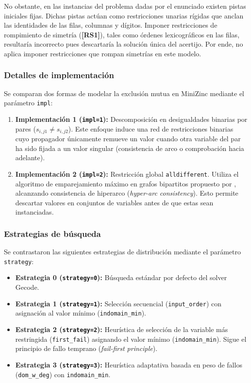 No obstante, en las instancias del problema dadas por el enunciado existen pistas iniciales fijas. Dichas pistas actúan como restricciones unarias rígidas que anclan las identidades de las filas, columnas y dígitos. Imponer restricciones de rompimiento de simetría (\textbf{[RS1]}), tales como órdenes lexicográficos en las filas, resultaría incorrecto pues descartaría la solución única del acertijo. Por ende, no aplica imponer restricciones que rompan simetrías en este modelo.

\subsubsection{Detalles de implementación}
Se comparan dos formas de modelar la exclusión mutua en MiniZinc mediante el parámetro \texttt{impl}:
\begin{enumerate}
    \item \textbf{Implementación 1 (\texttt{impl=1}):} Descomposición en desigualdades binarias por pares ($s_{i,j1} \neq s_{i,j2}$). Este enfoque induce una red de restricciones binarias cuyo propagador únicamente remueve un valor cuando otra variable del par ha sido fijada a un valor singular (consistencia de arco o comprobación hacia adelante).
    \item \textbf{Implementación 2 (\texttt{impl=2}):} Restricción global \texttt{alldifferent}. Utiliza el algoritmo de emparejamiento máximo en grafos bipartitos propuesto por \textcite{regin1994filtering}, alcanzando consistencia de hiperarco (\textit{hyper-arc consistency}). Esto permite descartar valores en conjuntos de variables antes de que estas sean instanciadas.
\end{enumerate}

\subsubsection{Estrategias de búsqueda}
Se contrastaron las siguientes estrategias de distribución mediante el parámetro \texttt{strategy}:
\begin{itemize}
    \item \textbf{Estrategia 0 (\texttt{strategy=0}):} Búsqueda estándar por defecto del solver Gecode.
    \item \textbf{Estrategia 1 (\texttt{strategy=1}):} Selección secuencial (\texttt{input\_order}) con asignación al valor mínimo (\texttt{indomain\_min}).
    \item \textbf{Estrategia 2 (\texttt{strategy=2}):} Heurística de selección de la variable más restringida (\texttt{first\_fail}) asignando el valor mínimo (\texttt{indomain\_min}). Sigue el principio de fallo temprano (\textit{fail-first principle}).
    \item \textbf{Estrategia 3 (\texttt{strategy=3}):} Heurística adaptativa basada en peso de fallos (\texttt{dom\_w\_deg}) con \texttt{indomain\_min}.
\end{itemize}

